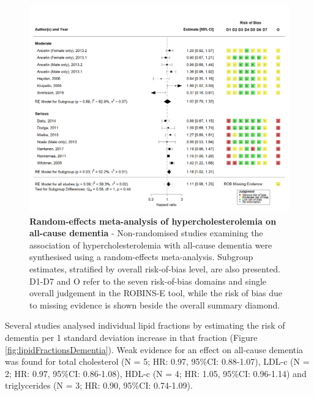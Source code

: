 \documentclass[a4paper, twoside]{templates/ociamthesis}
\begin{document}
\begin{figure}[H]
\includegraphics[width=1\linewidth]{figures/sys-rev/fp_obs_hyperchol_Dementia} \caption[Random-effects meta-analysis of hypercholesterolemia on all-cause dementia]{\textbf{Random-effects meta-analysis of hypercholesterolemia on all-cause dementia} - Non-randomised studies examining the association of hypercholesterolemia with all-cause dementia were synthesised using a random-effects meta-analysis. Subgroup estimates, stratified by overall risk-of-bias level, are also presented. D1-D7 and O refer to the seven risk-of-bias domains and single overall judgement in the ROBINS-E tool, while the risk of bias due to missing evidence is shown beside the overall summary diamond.}\label{fig:obsHyperDementia}
\end{figure}

Several studies analysed individual lipid fractions by estimating the risk of dementia per 1 standard deviation increase in that fraction (Figure \ref{fig:lipidFractionsDementia}). Weak evidence for an effect on all-cause dementia was found for total cholesterol (N = 5; HR: 0.97, 95\%CI: 0.88-1.07), LDL-c (N = 2; HR: 0.97, 95\%CI: 0.86-1.08), HDL-c (N = 4; HR: 1.05, 95\%CI: 0.96-1.14) and triglycerides (N = 3; HR: 0.90, 95\%CI: 0.74-1.09).

\newpage
\thispagestyle{empty}
\end{document}
